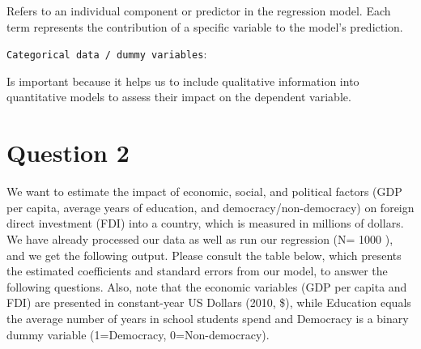 \documentclass[12pt,letterpaper]{article}
\begin{document}
Refers to an individual component or predictor in the regression model. Each term represents the contribution of a specific variable to the model's prediction.

\texttt{Categorical data / dummy variables}: 

Is important because it helps us to include qualitative information into quantitative models to assess their impact on the dependent variable.



\newpage

\section*{Question 2}
\vspace{.25cm}
\noindent We want to estimate the impact of economic, social, and political factors (GDP per capita,
average years of education, and democracy/non-democracy) on foreign direct investment
(FDI) into a country, which is measured in millions of dollars. We have already processed
our data as well as run our regression (N= 1000 ), and we get the following output. Please
consult the table below, which presents the estimated coefficients and standard errors from our
model, to answer the following questions. Also, note that the economic variables (GDP per
capita and FDI) are presented in constant-year US Dollars (2010, \$), while Education equals
the average number of years in school students spend and Democracy is a binary dummy
variable (1=Democracy, 0=Non-democracy). \\
\end{document}
